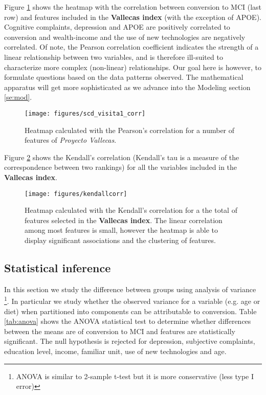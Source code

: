 \documentclass[11pt]{article}
\begin{document}
Figure \ref{fig:heatmappearson} shows the heatmap with the correlation between conversion to MCI (last row) and features included in the \textbf{Vallecas index} (with the exception of APOE). Cognitive complaints, depression and APOE are positively correlated to conversion and wealth-income and the use of new technologies are negatively correlated. 
Of note, the Pearson correlation coefficient indicates the strength of a linear relationship between two variables, and is therefore ill-suited to characterize more complex (non-linear) relationships.
Our goal here is however, to formulate questions based on the data patterns observed. The mathematical apparatus will get more sophisticated as we advance into the Modeling section \ref{se:mod}. 
 
 \begin{figure}[h!]
        \centering
        \texttt{[image: figures/scd\_visita1\_corr]}
        \caption{Heatmap calculated with the Pearson's correlation for a number of features of \emph{Proyecto Vallecas}.
        }
\label{fig:heatmappearson}
\end{figure}

Figure \ref{fig:kendall} shows the Kendall's correlation (Kendall’s tau is a measure of the correspondence between two rankings) 
for all the variables included in the \textbf{Vallecas index}.

\begin{figure}[h!]
        \centering
        \texttt{[image: figures/kendallcorr]}
        \caption{Heatmap calculated with the Kendall's correlation for a the total of features selected in the \textbf{Vallecas index}.
        The linear correlation among most features is small, however the heatmap is able to display significant associations and the clustering of features.}
\label{fig:kendall}
\end{figure}

\subsection{Statistical inference}
\label{sse:satinf}
In this section we study the difference between groups using analysis of variance \footnote{ANOVA is similar to 2-sample t-test but it is more conservative (less type I error)}. In particular we study whether the observed variance for a variable (e.g. age or diet) when partitioned into components can be attributable to conversion.
Table \ref{tab:anova} shows the ANOVA statistical test to determine whether differences between the means are of conversion to MCI and features are statistically significant. The null hypothesis is rejected for depression,  subjective complaints, education level, income, familiar unit, use of new technologies and age.
\end{document}
